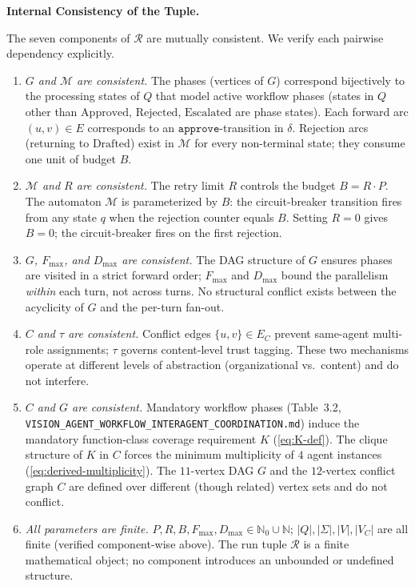 \documentclass[12pt]{article}
\theoremstyle{definition}
\newcommand{\code}[1]{\texttt{#1}}
\newcommand{\VisionFlow}{\code{VISION\_AGENT\_\allowbreak WORKFLOW\_\allowbreak INTERAGENT\_\allowbreak COORDINATION.md}}
\begin{document}
\medskip
\noindent\textbf{Internal Consistency of the Tuple.}

The seven components of $\mathcal{R}$ are mutually consistent.
We verify each pairwise dependency explicitly.

\begin{enumerate}
  \item \emph{$G$ and $\mathcal{M}$ are consistent.}
        The phases (vertices of $G$) correspond bijectively to the
        processing states of $Q$ that model active workflow phases
        (states in $Q$ other than $\mathrm{Approved}$,
        $\mathrm{Rejected}$, $\mathrm{Escalated}$ are phase states).
        Each forward arc $(u,v) \in E$ corresponds to an
        $\mathtt{approve}$-transition in $\delta$.
        Rejection arcs (returning to $\mathrm{Drafted}$) exist in
        $\mathcal{M}$ for every non-terminal state; they consume one
        unit of budget $B$.

  \item \emph{$\mathcal{M}$ and $R$ are consistent.}
        The retry limit $R$ controls the budget $B = R \cdot P$.
        The automaton $\mathcal{M}$ is parameterized by $B$:
        the circuit-breaker transition fires from any state $q$ when
        the rejection counter equals $B$.  Setting $R = 0$ gives
        $B = 0$; the circuit-breaker fires on the first rejection.

  \item \emph{$G$, $F_{\max}$, and $D_{\max}$ are consistent.}
        The DAG structure of $G$ ensures phases are visited in a
        strict forward order; $F_{\max}$ and $D_{\max}$ bound the
        parallelism \emph{within} each turn, not across turns.  No
        structural conflict exists between the acyclicity of $G$ and
        the per-turn fan-out.

  \item \emph{$C$ and $\tau$ are consistent.}
        Conflict edges $\{u,v\} \in E_C$ prevent same-agent
        multi-role assignments; $\tau$ governs content-level trust
        tagging.  These two mechanisms operate at different levels
        of abstraction (organizational vs.\ content) and do not
        interfere.

  \item \emph{$C$ and $G$ are consistent.}
        Mandatory workflow phases (Table~3.2, \VisionFlow{})
        induce the mandatory function-class coverage requirement $K$
        (\eqref{eq:K-def}).  The clique structure of $K$ in $C$ forces
        the minimum multiplicity of $4$ agent instances
        (\eqref{eq:derived-multiplicity}).  The $11$-vertex DAG $G$
        and the $12$-vertex conflict graph $C$ are defined over
        different (though related) vertex sets and do not conflict.

  \item \emph{All parameters are finite.}
        $P, R, B, F_{\max}, D_{\max} \in \mathbb{N}_0 \cup \mathbb{N}$;
        $|Q|, |\Sigma|, |V|, |V_C|$ are all finite (verified
        component-wise above).  The run tuple $\mathcal{R}$ is a
        finite mathematical object; no component introduces an
        unbounded or undefined structure.
\end{enumerate}
\end{document}

